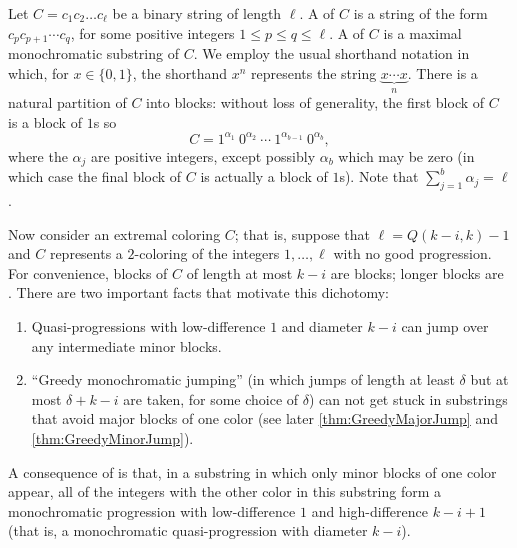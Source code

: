 Let $C=c_1c_2\ldots c_\ell$ be a binary string of length $\ell$. A  of $C$ is a string of the form $c_p c_{p+1}\cdots c_q$, for some positive integers $1 \leq p \leq q \leq \ell$. A  of $C$ is a maximal monochromatic substring of $C$. We employ the usual shorthand notation in which, for $x \in \{0,1\}$, the shorthand $x^n$ represents the string $\underbrace{x \cdots x}_{n}$. There is a natural partition of $C$ into blocks: without loss of generality, the first block of $C$ is a block of $1$s so \[C = 1^{\alpha_1}\ 0^{\alpha_2}\ \cdots\ 1^{\alpha_{b-1}}\ 0^{\alpha_b},\] where the $\alpha_j$ are positive integers, except possibly $\alpha_b$ which may be zero (in which case the final block of $C$ is actually a block of $1$s). Note that $\sum_{j=1}^b \alpha_j = \ell$.

Now consider an extremal coloring $C$; that is, suppose that $\ell = Q(k-i,k) - 1$ and $C$ represents a $2$-coloring of the integers $1,\ldots,\ell$ with no good progression. For convenience, blocks of $C$ of length at most $k-i$ are  blocks; longer blocks are . There are two important facts that motivate this dichotomy:
\begin{enumerate}
	\item\label{en:QP observation 1} Quasi-progressions with low-difference $1$ and diameter $k-i$ can jump over any intermediate minor blocks.
	\item\label{en:QP observation 2} ``Greedy monochromatic jumping'' (in which jumps of length at least $\delta$ but at most $\delta + k -i$ are taken, for some choice of $\delta$) can not get stuck in substrings that avoid major blocks of one color (see later \autoref{thm:GreedyMajorJump} and \autoref{thm:GreedyMinorJump}).
\end{enumerate}

A consequence of  is that, in a substring in which only minor blocks of one color appear, all of the integers with the other color in this substring form a monochromatic progression with low-difference $1$ and high-difference $k-i+1$ (that is, a monochromatic quasi-progression with diameter $k-i$).

